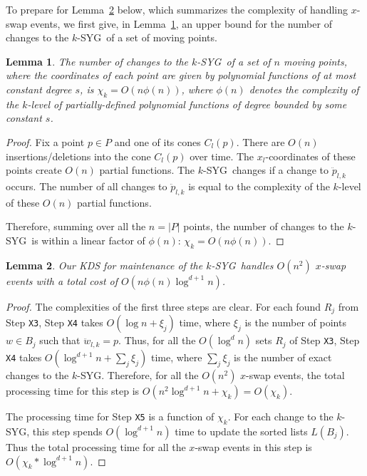 \documentclass[preprint,12pt]{elsarticle}
\def\ksyg{\mbox{$k$-SYG}}
\newtheorem{lemma}{Lemma}[section]
\begin{document}
To prepare for Lemma~\ref{the:XswapEvents} below, which summarizes the complexity of handling $x$-swap events, we first give, in Lemma~\ref{the:allKSYGchanges}, an upper bound for the number of changes to the \ksyg~of a set of moving points.


\begin{lemma}\label{the:allKSYGchanges}
The number of changes to the \ksyg~of a set of $n$ moving points, where the coordinates of each point are given by polynomial functions of at most constant degree $s$, is $\chi_k=O(n\phi(n))$, where $\phi(n)$ denotes the complexity of the $k$-level of  partially-defined polynomial functions of degree bounded by some constant $s$. 
\end{lemma}
\begin{proof}
Fix a point $p\in P$ and one of its cones $C_l(p)$. There are $O(n)$ insertions/deletions into the cone $C_l(p)$ over time. The $x_l$-coordinates of these points create $O(n)$ partial functions. The \ksyg~changes if a change to $\ddot{p}_{l,k}$ occurs. The number of all changes to $\ddot{p}_{l,k}$ is equal to  the complexity of the $k$-level of these $O(n)$ partial functions.

Therefore, summing over all the $n=|P|$ points, the number of changes to the \ksyg~is within a linear factor of $\phi(n)$: $\chi_k=O(n\phi(n))$. 
\end{proof}


\begin{lemma}\label{the:XswapEvents}
Our KDS for maintenance of the \ksyg~handles $O(n^2)$ $x$-swap events with a total cost of $O(n\phi(n)\log^{d+1}n)$.
\end{lemma}
\begin{proof}
The complexities of the first three steps are clear. For each found $R_j$ from Step \texttt{X3}, Step \texttt{X4} takes $O(\log n + \xi_j)$ time, where $\xi_j$ is the number of points $w\in B_j$ such that $\ddot{w}_{l,k}=p$. Thus, for all the $O(\log^d n)$ sets $R_j$ of Step \texttt{X3}, Step \texttt{X4} takes $O(\log^{d+1}n +\sum_j \xi_j)$ time, where $\sum_j \xi_j$ is the number of exact changes to the \ksyg. Therefore, for all the $O(n^2)$ $x$-swap events, the total processing time for this step is $O(n^2\log^{d+1}n+\chi_k)=O(\chi_k)$.

The processing time for Step \texttt{X5} is a function of $\chi_k$. For each change to the \ksyg, this step spends $O(\log^{d+1}n)$ time to update the sorted lists $L(B_j)$. Thus the total processing time for all the $x$-swap events in this step is $O(\chi_k*\log^{d+1}n)$.
\end{proof}
\end{document}
